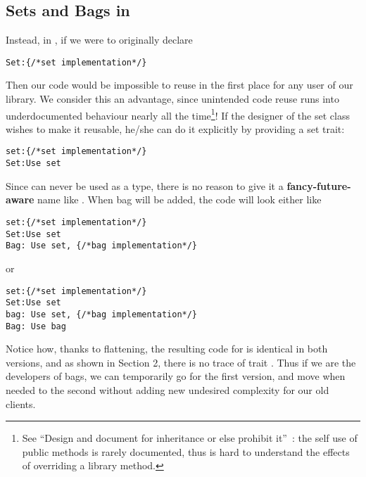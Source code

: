 \subsection{Sets and Bags in \name}
Instead, in \name, if we were to originally declare
\saveSpace\begin{lstlisting}
Set:{/*set implementation*/} 
\end{lstlisting}\saveSpace
Then our code would be impossible to reuse in the first place for any user of our library.
We consider this an advantage, since unintended code reuse runs into underdocumented behaviour nearly all the time\footnote{See
``Design and document for inheritance or else prohibit
it''~\cite{Bloch08}: the
self use of public methods is rarely documented, thus is hard to understand the effects of overriding a library method.
}!
If the designer of the set class wishes to make it reusable, he/she can do it explicitly by providing a set trait:
\saveSpace\begin{lstlisting}
set:{/*set implementation*/} 
Set:Use set
\end{lstlisting}\saveSpace
Since \Q@set@ can never be used as a type, there is no reason to give it a {\bf fancy-future-aware} name like
\Q@AbstractSetOrBag@.
When bag will be added, the code will look either like
\saveSpace\begin{lstlisting}
set:{/*set implementation*/} 
Set:Use set
Bag: Use set, {/*bag implementation*/}
\end{lstlisting}\saveSpace\saveSpace
or 
\saveSpace\saveSpace\begin{lstlisting}
set:{/*set implementation*/} 
Set:Use set
bag: Use set, {/*bag implementation*/}
Bag: Use bag
\end{lstlisting}\saveSpace
Notice how, thanks to flattening, the resulting code for \Q@Bag@ is identical in both versions, 
and as shown in Section 2, there is no trace of trait \Q@bag@. Thus if we are the developers of bags, we can temporarily go for the first version, and move when needed to the second without adding new undesired complexity for our old clients. 



